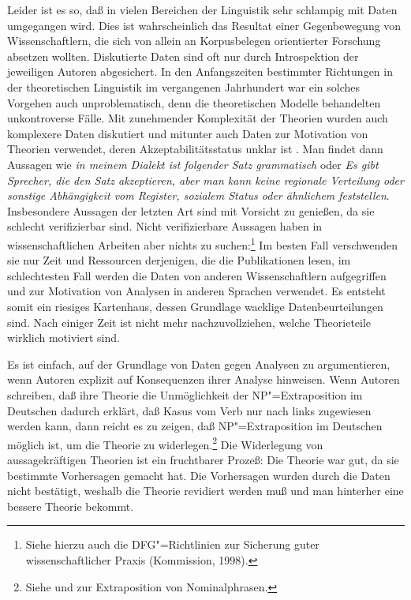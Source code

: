 Leider ist es so, daß in vielen Bereichen der Linguistik sehr schlampig mit Daten
umgegangen wird. Dies ist wahrscheinlich das Resultat einer Gegenbewegung
von Wissenschaftlern, die sich von allein an Korpusbelegen orientierter Forschung
absetzen wollten. Diskutierte Daten sind oft nur durch Introspektion der jeweiligen
Autoren abgesichert. In den Anfangszeiten bestimmter Richtungen
in der theoretischen Linguistik im vergangenen Jahrhundert war ein solches Vorgehen 
auch unproblematisch, denn die theoretischen Modelle behandelten unkontroverse Fälle.
Mit zunehmender Komplexität der Theorien wurden auch komplexere Daten diskutiert 
und mitunter auch Daten zur Motivation von Theorien verwendet, deren
Akzeptabilitätsstatus unklar ist \citep{Fanselow2004b}.
Man findet dann Aussagen wie \emph{in meinem Dialekt
ist folgender Satz grammatisch} oder \emph{Es gibt Sprecher, die den Satz akzeptieren,
aber man kann keine regionale Verteilung oder sonstige Abhängigkeit vom Register, sozialem
Status oder ähnlichem feststellen}. Insbesondere Aussagen der letzten Art sind mit Vorsicht
zu genießen, da sie schlecht verifizierbar sind. Nicht verifizierbare Aussagen haben
in wissenschaftlichen Arbeiten aber nichts zu suchen:\footnote{
  Siehe hierzu auch die DFG"=Richtlinien zur Sicherung guter wissenschaftlicher Praxis (Kommission, 1998)\nocite{DFG98a}.%
}
Im besten Fall verschwenden sie
nur Zeit und Ressourcen derjenigen, die die Publikationen lesen, im schlechtesten Fall werden die
Daten von anderen Wissenschaftlern aufgegriffen und zur Motivation von Analysen in
anderen Sprachen verwendet. Es entsteht somit ein riesiges Kartenhaus, dessen
Grundlage wacklige Datenbeurteilungen sind. Nach einiger Zeit ist nicht mehr nachzuvollziehen,
welche Theorieteile wirklich motiviert sind.

Es ist einfach, auf der Grundlage von Daten gegen Analysen zu argumentieren, wenn Autoren
explizit auf Konsequenzen ihrer Analyse hinweisen. Wenn Autoren \zb schreiben, daß ihre
Theorie die Unmöglichkeit der NP"=Extraposition im Deutschen dadurch erklärt, daß Kasus vom Verb
nur nach links zugewiesen werden kann, dann reicht es zu zeigen, daß NP"=Extraposition im Deutschen
möglich ist, um die Theorie zu widerlegen.\footnote{
  Siehe  und  zur Extraposition von Nominalphrasen.%
}
Die Widerlegung von aussagekräftigen Theorien ist ein fruchtbarer Prozeß: Die Theorie war gut,
da sie bestimmte Vorhersagen gemacht hat. Die Vorhersagen wurden durch die Daten nicht bestätigt,
weshalb die Theorie revidiert werden muß und man hinterher eine bessere Theorie bekommt.

